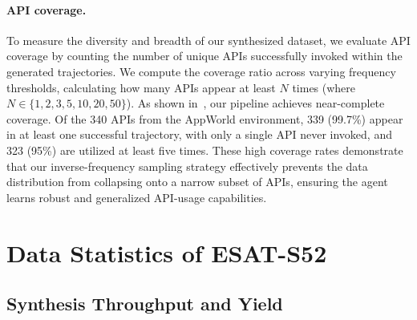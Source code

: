 \paragraph{API coverage.}
To measure the diversity and breadth of our synthesized dataset, we evaluate API coverage by counting the number of unique APIs successfully invoked within the generated trajectories. We compute the coverage ratio across varying frequency thresholds, calculating how many APIs appear at least $N$ times (where $N \in \{1, 2, 3, 5, 10, 20, 50\}$). As shown in~, our pipeline achieves near-complete coverage. Of the 340 APIs from the AppWorld environment, 339 (99.7\%) appear in at least one successful trajectory, with only a single API never invoked, and 323 (95\%) are utilized at least five times. These high coverage rates demonstrate that our inverse-frequency sampling strategy effectively prevents the data distribution from collapsing onto a narrow subset of APIs, ensuring the agent learns robust and generalized API-usage capabilities.





\FloatBarrier
\section{Data Statistics of \textsc{ESAT}-S52}
\label{app:stats-ESAT-S52}

\subsection{Synthesis Throughput and Yield}



